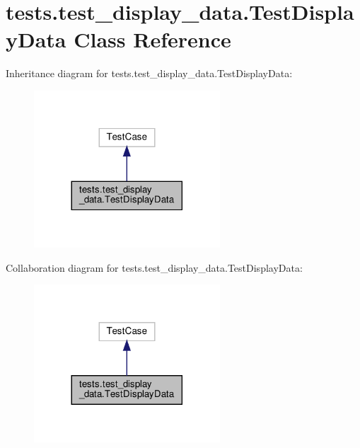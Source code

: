 \hypertarget{classtests_1_1test__display__data_1_1TestDisplayData}{}\section{tests.\+test\+\_\+display\+\_\+data.\+Test\+Display\+Data Class Reference}
\label{classtests_1_1test__display__data_1_1TestDisplayData}


Inheritance diagram for tests.\+test\+\_\+display\+\_\+data.\+Test\+Display\+Data\+:
\nopagebreak
\begin{figure}[H]
\begin{center}
\leavevmode
\includegraphics[width=197pt]{da/d34/classtests_1_1test__display__data_1_1TestDisplayData__inherit__graph}
\end{center}
\end{figure}


Collaboration diagram for tests.\+test\+\_\+display\+\_\+data.\+Test\+Display\+Data\+:
\nopagebreak
\begin{figure}[H]
\begin{center}
\leavevmode
\includegraphics[width=197pt]{d9/da5/classtests_1_1test__display__data_1_1TestDisplayData__coll__graph}
\end{center}
\end{figure}
